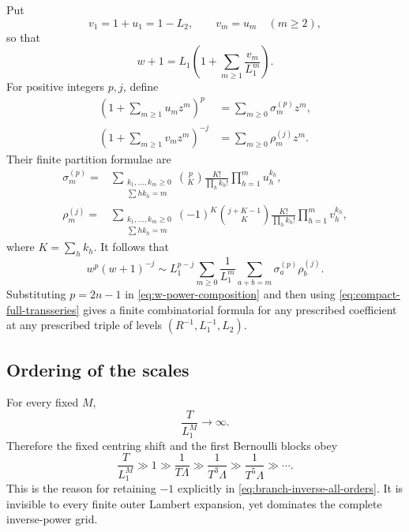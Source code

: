 \documentclass[11pt,a4paper,oneside]{article}
\theoremstyle{plain}
\theoremstyle{definition}
\theoremstyle{remark}
\begin{document}
Put
\begin{equation}
 v_1=1+u_1=1-L_2,
 \qquad v_m=u_m\quad(m\ge2),
 \label{eq:v-def}
\end{equation}
so that
\begin{equation}
 w+1=L_1\left(1+\sum_{m\ge1}\frac{v_m}{L_1^m}\right).
 \label{eq:wplus1-v}
\end{equation}
For positive integers $p,j$, define
\begin{align}
 (1+\textstyle\sum_{m\ge1}u_mz^m)^p
 &=\sum_{m\ge0}\sigma_m^{(p)}z^m,
 \label{eq:sigma-def}\\
 (1+\textstyle\sum_{m\ge1}v_mz^m)^{-j}
 &=\sum_{m\ge0}\rho_m^{(j)}z^m.
 \label{eq:rho-def}
\end{align}
Their finite partition formulae are
\begin{align}
 \sigma_m^{(p)}={}&
 \sum_{\substack{k_1,\ldots,k_m\ge0\\\sum hk_h=m}}
 \binom{p}{K}\frac{K!}{\prod_hk_h!}
 \prod_{h=1}^m u_h^{k_h},
 \label{eq:sigma-partition}\\
 \rho_m^{(j)}={}&
 \sum_{\substack{k_1,\ldots,k_m\ge0\\\sum hk_h=m}}
 (-1)^K\binom{j+K-1}{K}\frac{K!}{\prod_hk_h!}
 \prod_{h=1}^m v_h^{k_h},
 \label{eq:rho-partition}
\end{align}
where $K=\sum_hk_h$.  It follows that
\begin{equation}
 w^p(w+1)^{-j}
 \sim L_1^{p-j}\sum_{m\ge0}\frac1{L_1^m}
 \sum_{a+b=m}\sigma_a^{(p)}\rho_b^{(j)}.
 \label{eq:w-power-composition}
\end{equation}
Substituting $p=2n-1$ in \cref{eq:w-power-composition} and then using
\cref{eq:compact-full-transseries} gives a finite combinatorial formula for
any prescribed coefficient at any prescribed triple of levels
$(R^{-1},L_1^{-1},L_2)$.

\subsection{Ordering of the scales}

For every fixed $M$,
\begin{equation}
 \frac{T}{L_1^M}\longrightarrow\infty.
 \label{eq:T-beyond-outer}
\end{equation}
Therefore the fixed centring shift and the first Bernoulli blocks obey
\begin{equation}
 \frac{T}{L_1^M}\gg1\gg\frac1{T\Lambda}
 \gg\frac1{T^3\Lambda}\gg\frac1{T^5\Lambda}\gg\cdots.
 \label{eq:nested-scale-ordering}
\end{equation}
This is the reason for retaining $-1$ explicitly in
\cref{eq:branch-inverse-all-orders}.  It is invisible to every finite
outer Lambert expansion, yet dominates the complete inverse-power grid.
\end{document}
